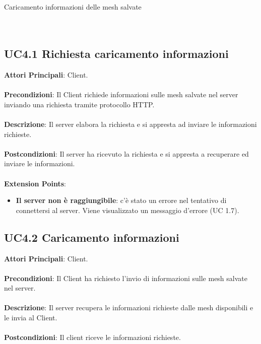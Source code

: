 \begin{usecase}{4}{Caricamento informazioni delle mesh salvate}
\\ 
\\ 
\\ 
\label{uc:informazioni}
\end{usecase}

\subsection{UC4.1 Richiesta caricamento informazioni}
\textbf{Attori Principali}: Client.
\\\\ \textbf{Precondizioni}: Il Client richiede informazioni sulle mesh salvate nel server inviando una richiesta tramite protocollo HTTP.
\\\\ \textbf{Descrizione}: Il server elabora la richiesta e si appresta ad inviare le informazioni richieste.
\\\\ \textbf{Postcondizioni}: Il server ha ricevuto la richiesta e si appresta a recuperare ed inviare le informazioni.
\\\\ \textbf{Extension Points}:
\begin{itemize}
\item \textbf{Il server non è raggiungibile}: c'è stato un errore nel tentativo di connettersi al server. Viene visualizzato un messaggio d'errore (UC 1.7).
\end{itemize}

\subsection{UC4.2 Caricamento informazioni}
\textbf{Attori Principali}: Client.
\\\\ \textbf{Precondizioni}: Il Client ha richiesto l'invio di informazioni sulle mesh salvate nel server.
\\\\ \textbf{Descrizione}: Il server recupera le informazioni richieste dalle mesh disponibili e le invia al Client.
\\\\ \textbf{Postcondizioni}: Il client riceve le informazioni richieste.


